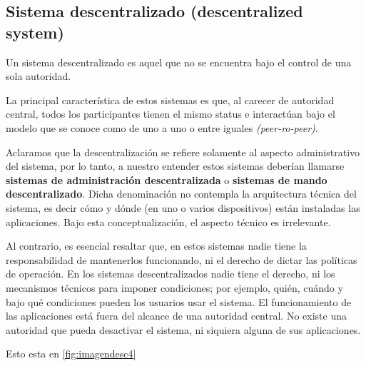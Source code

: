 \documentclass[12pt]{report} %
\begin{document}
\begin{itemize}
\section{Sistema descentralizado (descentralized system)}

Un sistema descentralizado es aquel que no se encuentra bajo el control de una sola autoridad.

La principal característica de estos sistemas es que, al carecer de autoridad central, todos los participantes tienen el mismo status e interactúan bajo el modelo que se conoce como de uno a uno o entre iguales \textit{(peer-ro-peer)}.  

Aclaramos que la descentralización se refiere solamente al aspecto administrativo del sistema, por lo tanto, a nuestro entender estos sistemas deberían llamarse \textbf{sistemas de administración descentralizada} o \textbf{sistemas de mando descentralizado}. Dicha denominación no contempla la arquitectura técnica del sistema, es decir cómo y dónde (en uno o varios dispositivos) están instaladas las aplicaciones. Bajo esta conceptualización, el aspecto técnico es irrelevante. 

Al contrario, es esencial resaltar que, en estos sistemas nadie tiene la responsabilidad de mantenerlos funcionando, ni el derecho de dictar las políticas de operación. En los sistemas descentralizados nadie tiene el derecho, ni los mecanismos técnicos para imponer condiciones; por ejemplo, quién, cuándo y bajo qué condiciones pueden los usuarios usar el sistema. El funcionamiento de las aplicaciones está fuera del alcance de una autoridad central. No existe una autoridad que pueda desactivar el sistema, ni siquiera alguna de sus aplicaciones.


Esto esta en \ref{fig:imagendesc4}
 

\end{itemize}
\end{document}
